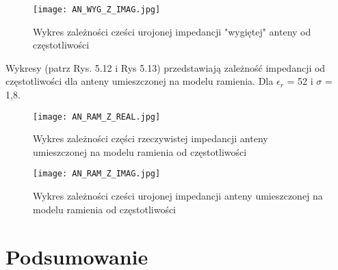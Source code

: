 \newpage
\begin{figure}[h!]
\centering
	\texttt{[image: AN\_WYG\_Z\_IMAG.jpg]}
	\caption{Wykres zależności cześci urojonej impedancji "wygiętej" anteny od częstotliwości}
\end{figure}



\newpage
Wykresy (patrz Rys. 5.12 i Rys 5.13) przedstawiają zależność impedancji od częstotliwości dla anteny umieszczonej na modelu ramienia. Dla\cite{Artykul_1}  $\epsilon_{r}$ = 52 i $\sigma$ = 1,8.
\begin{figure}[h!]
\centering
	\texttt{[image: AN\_RAM\_Z\_REAL.jpg]}
	\caption{Wykres zależności części rzeczywistej impedancji anteny umieszczonej na modelu ramienia od częstotliwości}
\end{figure}


\newpage
\begin{figure}[h!]
\centering
	\texttt{[image: AN\_RAM\_Z\_IMAG.jpg]}
	\caption{Wykres zależności cześci urojonej impedancji anteny umieszczonej na modelu ramienia od częstotliwości}
\end{figure}


\chapter{Podsumowanie}

